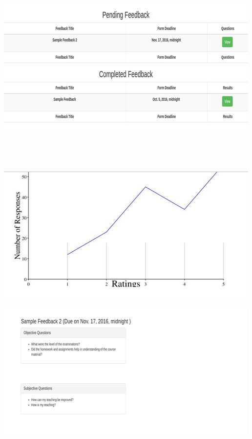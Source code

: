 \documentclass[11pt]{report}
\begin{document}
\begin{outline}
\begin{outline}
\newpage
\includegraphics{feedback}   \\ \\ \\ \\ \\
\includegraphics{graph} 

\newpage
\includegraphics{s_feedback}   \\ \\ \\ \\ \\



\end{outline}
\end{outline}
\end{document}

